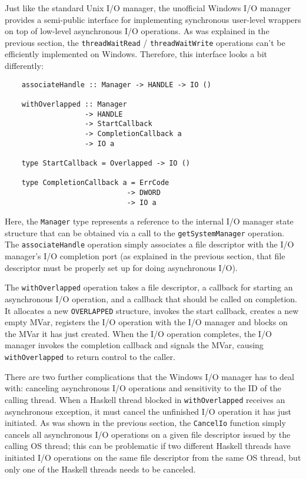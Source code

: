 \documentclass[a4paper,11pt,oneside]{report}
\begin{document}
Just like the standard Unix I/O manager, the unofficial Windows I/O manager
provides a semi-public interface for implementing synchronous user-level
wrappers on top of low-level asynchronous I/O operations. As was explained in
the previous section, the \texttt{threadWaitRead} / \texttt{threadWaitWrite}
operations can't be efficiently implemented on Windows. Therefore, this
interface looks a bit differently:

\begin{verbatim}
    associateHandle :: Manager -> HANDLE -> IO ()

    withOverlapped :: Manager
                   -> HANDLE
                   -> StartCallback
                   -> CompletionCallback a
                   -> IO a

    type StartCallback = Overlapped -> IO ()

    type CompletionCallback a = ErrCode
                             -> DWORD
                             -> IO a
\end{verbatim}

Here, the \texttt{Manager} type represents a reference to the internal I/O
manager state structure that can be obtained via a call to the
\texttt{getSystemManager} operation. The \texttt{associateHandle} operation
simply associates a file descriptor with the I/O manager's I/O completion port
(as explained in the previous section, that file descriptor must be properly set
up for doing asynchronous I/O).

The \texttt{withOverlapped} operation takes a file descriptor, a callback for
starting an asynchronous I/O operation, and a callback that should be called on
completion. It allocates a new \texttt{OVERLAPPED} structure, invokes the start
callback, creates a new empty MVar, registers the I/O operation with the I/O
manager and blocks on the MVar it has just created. When the I/O operation
completes, the I/O manager invokes the completion callback and signals the MVar,
causing \texttt{withOverlapped} to return control to the caller.

There are two further complications that the Windows I/O manager has to deal
with: canceling asynchronous I/O operations and sensitivity to the ID of the
calling thread. When a Haskell thread blocked in \texttt{withOverlapped}
receives an asynchronous exception, it must cancel the unfinished I/O operation
it has just initiated. As was shown in the previous section, the
\texttt{CancelIo} function simply cancels all asynchronous I/O operations on a
given file descriptor issued by the calling OS thread; this can be problematic
if two different Haskell threads have initiated I/O operations on the same file
descriptor from the same OS thread, but only one of the Haskell threads needs to
be canceled.
\end{document}
